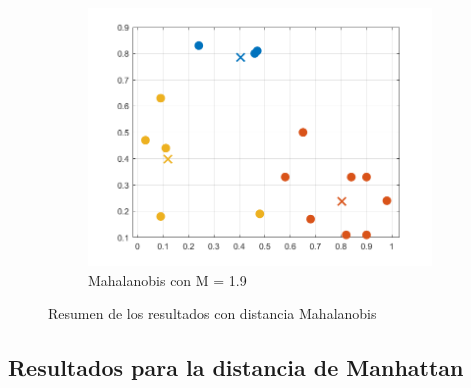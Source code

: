 \documentclass[11pt, letterpaper]{article}
\begin{document}
\begin{figure}[h!]
\begin{subfigure}[b]{0.50\textwidth}
		\includegraphics[width=\textwidth]{IMG/R23.png}
		\caption{Mahalanobis con  M = 1.9}
		\label{fig:r6}
	\end{subfigure}\hfill
	\caption{Resumen de los resultados con distancia Mahalanobis}
	\label{fig:cuadro_r2}
\end{figure}


\newpage

\subsection{Resultados para la distancia de Manhattan}
\end{document}
